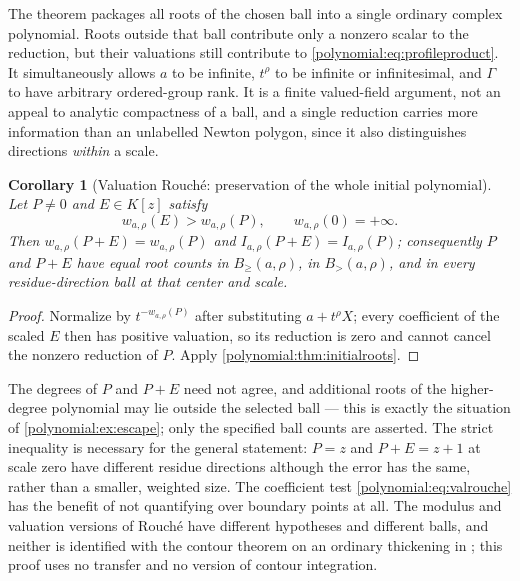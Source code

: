 \documentclass[11pt,letterpaper]{article}
\numberwithin{equation}{section}
\newtheorem{corollary}[theorem]{Corollary}
\theoremstyle{definition}
\theoremstyle{remark}\newtheorem{remark}[theorem]{Remark}
\newcommand{\Bge}[2]{B_{\ge}(#1,#2)}
\newcommand{\Bgt}[2]{B_{>}(#1,#2)}
\begin{document}
The theorem packages all roots of the chosen ball into a single ordinary
complex polynomial. Roots outside that ball contribute only a nonzero scalar
to the reduction, but their valuations still contribute to
\eqref{polynomial:eq:profileproduct}. It simultaneously allows $a$ to be
infinite, $t^\rho$ to be infinite or infinitesimal, and $\Gamma$ to have
arbitrary ordered-group rank. It is a finite valued-field argument, not an
appeal to analytic compactness of a ball, and a single reduction carries more
information than an unlabelled Newton polygon, since it also distinguishes
directions \emph{within} a scale.

\begin{corollary}[Valuation Rouch\'e: preservation of the whole initial
polynomial]\label{polynomial:cor:valrouche}
Let $P\ne0$ and $E\in K[z]$ satisfy
\begin{equation}\label{polynomial:eq:valrouche}
 w_{a,\rho}(E)>w_{a,\rho}(P),\qquad w_{a,\rho}(0)=+\infty .
\end{equation}
Then $w_{a,\rho}(P+E)=w_{a,\rho}(P)$ and $I_{a,\rho}(P+E)=I_{a,\rho}(P)$;
consequently $P$ and $P+E$ have equal root counts in $\Bge a\rho$, in
$\Bgt a\rho$, and in every residue-direction ball at that center and scale.
\end{corollary}
\begin{proof}
Normalize by $t^{-w_{a,\rho}(P)}$ after substituting $a+t^\rho X$; every
coefficient of the scaled $E$ then has positive valuation, so its reduction is
zero and cannot cancel the nonzero reduction of $P$. Apply
\cref{polynomial:thm:initialroots}.
\end{proof}

The degrees of $P$ and $P+E$ need not agree, and additional roots of the
higher-degree polynomial may lie outside the selected ball --- this is exactly
the situation of \cref{polynomial:ex:escape}; only the specified ball counts
are asserted. The strict inequality is necessary for the general statement:
$P=z$ and $P+E=z+1$ at scale zero have different residue directions although
the error has the same, rather than a smaller, weighted size. The coefficient
test \eqref{polynomial:eq:valrouche} has the benefit of not quantifying over
boundary points at all. The modulus and valuation versions of Rouch\'e have
different hypotheses and different balls, and neither is identified with the
contour theorem on an ordinary thickening in
\cite{polynomial:SourceAnalysis}; this proof uses no transfer and no version
of contour integration.
\end{document}
